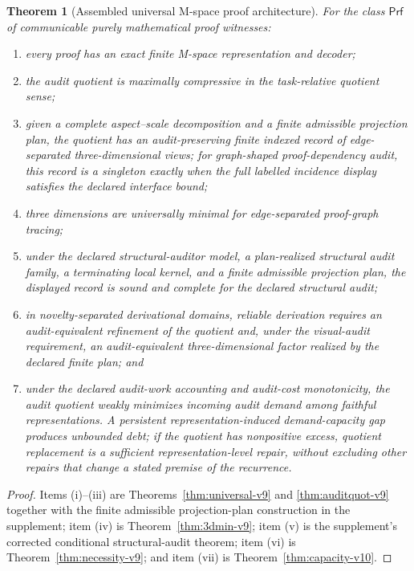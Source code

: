 \documentclass[11pt]{article}
\newcommand{\Proofs}{\ensuremath{\mathsf{Prf}}}
\theoremstyle{plain}
\newtheorem{theorem}{Theorem}[section]
\theoremstyle{definition}
\theoremstyle{remark}
\begin{document}
\begin{theorem}[Assembled universal M-space proof architecture]
\label{thm:fullarch-v9}
For the class $\Proofs$ of communicable purely mathematical proof witnesses:
\begin{enumerate}[label=\textnormal{(\roman*)},leftmargin=2.6em]
\item every proof has an exact finite M-space representation and decoder;
\item the audit quotient is maximally compressive in the task-relative quotient
sense;
\item given a complete aspect--scale decomposition and a finite admissible
projection plan, the quotient has an audit-preserving finite indexed record of
edge-separated three-dimensional views; for graph-shaped proof-dependency audit,
this record is a singleton exactly when the full labelled incidence display
satisfies the declared interface bound;
\item three dimensions are universally minimal for edge-separated proof-graph
tracing;
\item under the declared structural-auditor model, a plan-realized structural
audit family, a terminating local kernel, and a finite admissible projection
plan, the displayed record is sound and complete for the declared structural
audit;
\item in novelty-separated derivational domains, reliable derivation requires an
audit-equivalent refinement of the quotient and, under the visual-audit
requirement, an audit-equivalent three-dimensional factor realized by the
declared finite plan; and
\item under the declared audit-work accounting and audit-cost monotonicity,
the audit quotient weakly minimizes incoming audit demand among faithful
representations.  A persistent representation-induced demand-capacity gap
produces unbounded debt; if the quotient has nonpositive excess, quotient
replacement is a sufficient representation-level repair, without excluding
other repairs that change a stated premise of the recurrence.
\end{enumerate}
\end{theorem}

\begin{proof}
Items (i)--(iii) are Theorems~\ref{thm:universal-v9} and
\ref{thm:auditquot-v9} together with the finite admissible projection-plan
construction in the supplement; item (iv) is Theorem~\ref{thm:3dmin-v9};
item (v) is the supplement's corrected conditional structural-audit theorem;
item (vi) is Theorem~\ref{thm:necessity-v9}; and item (vii) is
Theorem~\ref{thm:capacity-v10}.
\end{proof}
\end{document}
